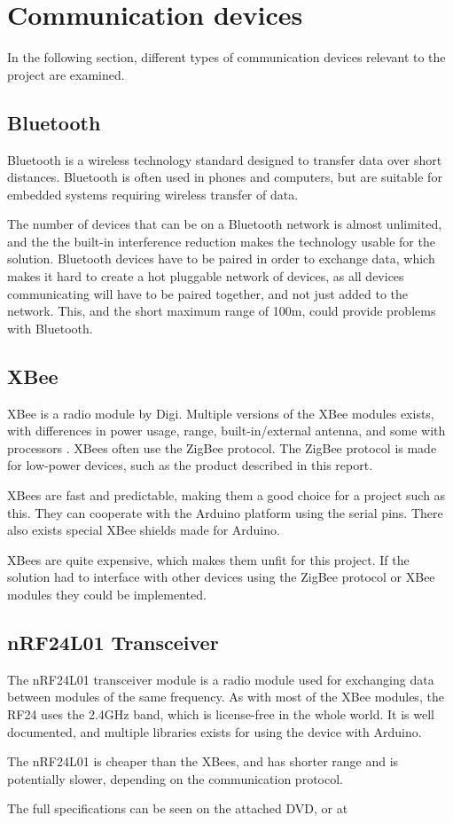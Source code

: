 \section{Communication devices}
In the following section, different types of communication devices relevant to the project are examined.

\subsection{Bluetooth}
Bluetooth is a wireless technology standard designed to transfer data over short distances\cite{bluetoothbasics}. Bluetooth is often used in phones and computers, but are suitable for embedded systems requiring wireless transfer of data.

The number of devices that can be on a Bluetooth network is almost unlimited, and the the built-in interference reduction makes the technology usable for the solution\cite{bluetoothbasics}.
Bluetooth devices have to be paired in order to exchange data, which makes it hard to create a hot pluggable network of devices, as all devices communicating will have to be paired together, and not just added to the network. 
This, and the short maximum range of 100m\cite{bluetoothbasics}, could provide problems with Bluetooth.

\subsection{XBee}
XBee is a radio module by Digi. Multiple versions of the XBee modules exists, with differences in power usage, range, built-in/external antenna, and some with processors \cite{sparkfunXbeeGuide}.
XBees often use the ZigBee protocol. The ZigBee protocol is made for low-power devices, such as the product described in this report\cite{zigbee}.

XBees are fast and predictable, making them a good choice for a project such as this. They can cooperate with the Arduino platform using the serial pins. There also exists special XBee shields made for Arduino.

XBees are quite expensive, which makes them unfit for this project. If the solution had to interface with other devices using the ZigBee protocol or XBee modules they could be implemented.

\subsection{nRF24L01 Transceiver}
The nRF24L01 transceiver module is a radio module used for exchanging data between modules of the same frequency. As with most of the XBee modules, the RF24 uses the 2.4GHz band, which is license-free in the whole world\cite{itubands}. It is well documented, and multiple libraries exists for using the device with Arduino.

The nRF24L01 is cheaper than the XBees, and has shorter range and is potentially slower, depending on the communication protocol.

The full specifications can be seen on the attached DVD, or at \cite{nf24datasheet}

